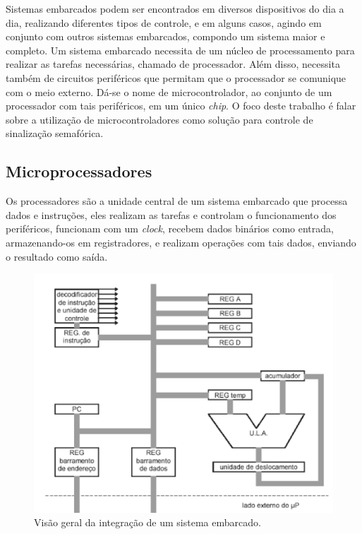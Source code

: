 Sistemas embarcados podem ser encontrados em diversos dispositivos do dia a dia, realizando diferentes tipos de controle, e em alguns casos, agindo em conjunto com outros sistemas embarcados, compondo um sistema maior e completo.
Um sistema embarcado necessita de um núcleo de processamento para realizar as tarefas necessárias, chamado de processador. Além disso, necessita também de circuitos periféricos que permitam que o processador se comunique com o meio externo. Dá-se o nome de microcontrolador, ao conjunto de um processador com tais periféricos, em um único \textit{chip}.
O foco deste trabalho é falar sobre a utilização de microcontroladores como solução para controle de sinalização semafórica. 

\subsection{Microprocessadores}

Os processadores são a unidade central de um sistema embarcado que processa dados e instruções, eles realizam as tarefas e controlam o funcionamento dos periféricos, funcionam com um \textit{clock}, recebem dados binários como entrada, armazenando-os em registradores, e realizam operações com tais dados, enviando o resultado como saída\cite{book3}. 

\begin{figure}[ht]
    \begin{center}
    \includegraphics{figuras/processor.PNG}
    \end{center}
    \caption[Sistema embarcado]{Visão geral da integração de um sistema embarcado.}
    \label{processor}
\end{figure}

